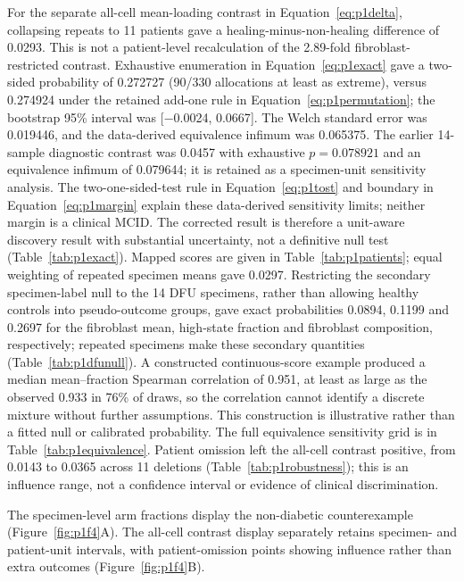 \documentclass[10pt,a4paper]{article}
\begin{document}
For the separate all-cell mean-loading contrast in Equation~\eqref{eq:p1delta}, collapsing repeats to 11 patients gave a healing-minus-non-healing difference of 0.0293. This is not a patient-level recalculation of the 2.89-fold fibroblast-restricted contrast. Exhaustive enumeration in Equation~\eqref{eq:p1exact} gave a two-sided probability of 0.272727 (90/330 allocations at least as extreme), versus 0.274924 under the retained add-one rule in Equation~\eqref{eq:p1permutation}; the bootstrap 95\% interval was {[}−0.0024, 0.0667{]}. The Welch standard error was 0.019446, and the data-derived equivalence infimum was 0.065375. The earlier 14-sample diagnostic contrast was 0.0457 with exhaustive $p=0.078921$ and an equivalence infimum of 0.079644; it is retained as a specimen-unit sensitivity analysis. The two-one-sided-test rule in Equation~\eqref{eq:p1tost} and boundary in Equation~\eqref{eq:p1margin} explain these data-derived sensitivity limits; neither margin is a clinical MCID. The corrected result is therefore a unit-aware discovery result with substantial uncertainty, not a definitive null test (Table~\ref{tab:p1exact}). Mapped scores are given in Table~\ref{tab:p1patients}; equal weighting of repeated specimen means gave 0.0297. Restricting the secondary specimen-label null to the 14 DFU specimens, rather than allowing healthy controls into pseudo-outcome groups, gave exact probabilities 0.0894, 0.1199 and 0.2697 for the fibroblast mean, high-state fraction and fibroblast composition, respectively; repeated specimens make these secondary quantities (Table~\ref{tab:p1dfunull}). A constructed continuous-score example produced a median mean--fraction Spearman correlation of 0.951, at least as large as the observed 0.933 in 76\% of draws, so the correlation cannot identify a discrete mixture without further assumptions. This construction is illustrative rather than a fitted null or calibrated probability. The full equivalence sensitivity grid is in Table~\ref{tab:p1equivalence}. Patient omission left the all-cell contrast positive, from 0.0143 to 0.0365 across 11 deletions (Table~\ref{tab:p1robustness}); this is an influence range, not a confidence interval or evidence of clinical discrimination.

The specimen-level arm fractions display the non-diabetic counterexample (Figure~\ref{fig:p1f4}A\label{call:p1f4}). The all-cell contrast display separately retains specimen- and patient-unit intervals, with patient-omission points showing influence rather than extra outcomes (Figure~\ref{fig:p1f4}B).
\end{document}
